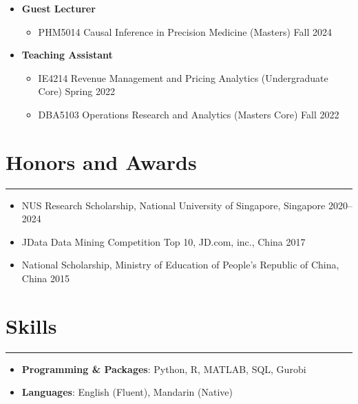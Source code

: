 \documentclass[12pt, a4paper]{article}
\begin{document}
{\begin{itemize}[leftmargin=16pt]
	\item[] \textbf{Guest Lecturer}
	\begin{itemize}[label=$\bullet$]
		\item PHM5014 Causal Inference in Precision Medicine (Masters) \hfill Fall 2024
	\end{itemize}

	\item[] \textbf{Teaching Assistant}
	\begin{itemize}[label=$\bullet$]
		\item IE4214 Revenue Management and Pricing Analytics (Undergraduate Core) \hfill Spring 2022
		\item DBA5103 Operations Research and Analytics (Masters Core) \hfill Fall 2022
	\end{itemize}
\end{itemize}




\section*{Honors and Awards}
\vspace*{4pt}
\hrule

\begin{itemize}[leftmargin=30pt, parsep=0.5pt]
	\item NUS Research Scholarship, National University of Singapore, Singapore \hfill 2020--2024
	\item JData Data Mining Competition Top 10, JD.com, inc., China \hfill 2017
	\item National Scholarship, Ministry of Education of People's Republic of China, China \hfill 2015
\end{itemize}




\section*{Skills}
\vspace*{4pt}
\hrule

\begin{itemize}[leftmargin=16pt]
	\item[] \textbf{Programming \& Packages}: Python, R, MATLAB, SQL, Gurobi
	\item[] \textbf{Languages}: English (Fluent), Mandarin (Native)
\end{itemize}


}

\end{document}
